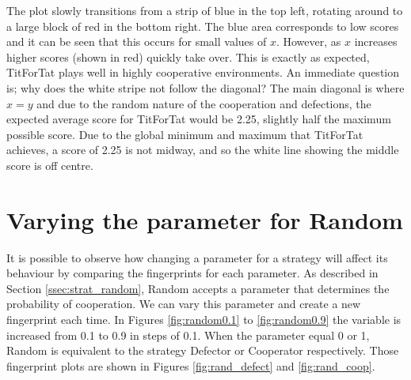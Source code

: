 The plot slowly transitions from a strip of blue in the top left, rotating around to a large block of red in the bottom right.
The blue area corresponds to low scores and it can be seen that this occurs for small values of $x$.
However, as $x$ increases higher scores (shown in red) quickly take over.
This is exactly as expected, TitForTat plays well in highly cooperative environments.
An immediate question is; why does the white stripe not follow the diagonal?
The main diagonal is where $x=y$ and due to the random nature of the cooperation and defections, the expected average score for TitForTat would be 2.25, slightly half the maximum possible score.
Due to the global minimum and maximum that TitForTat achieves, a score of 2.25 is not midway, and so the white line showing the middle score is off centre.



\section{Varying the parameter for Random}

It is possible to observe how changing a parameter for a strategy will affect its behaviour by comparing the fingerprints for each parameter.
As described in Section \ref{ssec:strat_random}, Random accepts a parameter that determines the probability of cooperation.
We can vary this parameter and create a new fingerprint each time.{}
In Figures \ref{fig:random0.1} to \ref{fig:random0.9} the variable is increased from 0.1 to 0.9 in steps of 0.1.
When the parameter equal 0 or 1, Random is equivalent to the strategy Defector or Cooperator respectively.
Those fingerprint plots are shown in Figures \ref{fig:rand_defect} and \ref{fig:rand_coop}.

